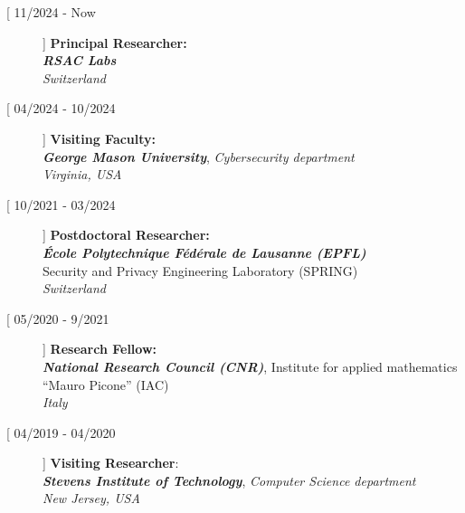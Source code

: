 \documentclass[margin, 10pt]{article} %
\begin{document}
\begin{description}
	
\item[[ {11/2024 - Now}]] \textbf{Principal Researcher}\textbf{:}\\
 \textbf{\textit{RSAC Labs}}\\
 \textit{Switzerland}

\item[[ {04/2024 - 10/2024}]] \textbf{Visiting Faculty:}\\
 \textbf{\textit{George Mason University}},  \textit{Cybersecurity department}\\
 \textit{Virginia, USA}

\item[[ {10/2021 - 03/2024}]] \textbf{Postdoctoral Researcher:}\\
 \textbf{\textit{École Polytechnique Fédérale de Lausanne (EPFL)}}\\ 
Security and Privacy Engineering Laboratory (SPRING)\\
\textit{Switzerland}
\item[[ 05/2020 - 9/2021]] \textbf{Research Fellow:}\\
 \textbf{\textit{National Research Council (CNR)}}, 
Institute for applied mathematics ``Mauro Picone'' (IAC)\\
\textit{Italy}
\item[[ 04/2019 - 04/2020]] \textbf{Visiting Researcher}:\\
 \textbf{\textit{Stevens Institute of Technology}}, \textit{Computer Science department}\\ 
\textit{New Jersey, USA}
	

\end{description}
\end{document}

